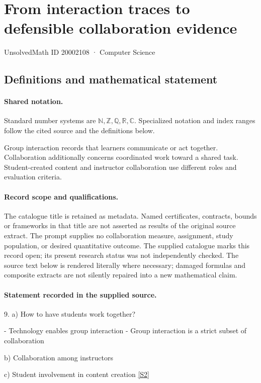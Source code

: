 \documentclass[11pt]{article}
\newcommand{\sref}[2]{\hyperlink{source:#1:#2}{[S#2]}}
\begin{document}
\setcounter{section}{20002107}
\section{From interaction traces to defensible collaboration evidence}\label{20002108}
{\small\sffamily UnsolvedMath ID 20002108 · Computer Science}
\subsection{Definitions and mathematical statement}

\paragraph{Shared notation.}Standard number systems are $\mathbb N,\mathbb Z,\mathbb Q,\mathbb R,\mathbb C$. Specialized notation and index ranges follow the cited source and the definitions below.


Group interaction records that learners communicate or act together. Collaboration additionally concerns coordinated work toward a shared task. Student-created content and instructor collaboration use different roles and evaluation criteria.
\paragraph{Record scope and qualifications.}
The catalogue title is retained as metadata. Named certificates, contracts, bounds or frameworks in that title are not asserted as results of the original source extract.
The prompt supplies no collaboration measure, assignment, study population, or desired quantitative outcome. The supplied catalogue marks this record open; its present research status was not independently checked.
The source text below is rendered literally where necessary; damaged formulas and composite extracts are not silently repaired into a new mathematical claim.
\paragraph{Statement recorded in the supplied source.}
9. a) How to have students work together?

- Technology enables group interaction - Group interaction is a strict subset of collaboration

b) Collaboration among instructors

c) Student involvement in content creation \sref{20002108}{2}
\end{document}
